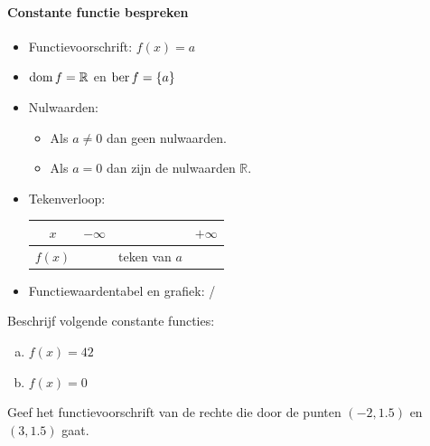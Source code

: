 \documentclass[12pt]{article}
\begin{document}
\paragraph*{Constante functie bespreken}
\begin{mdframed}
  \begin{itemize}
  \item Functievoorschrift: $f(x)=a$
  \item $\dom f = \mathbb{R}$ en $\ber f = \{a\}$
  \item Nulwaarden:
    \begin{itemize}
    \item Als $a\neq 0$ dan geen nulwaarden.
    \item Als $a=0$ dan zijn de nulwaarden $\mathbb{R}$.
    \end{itemize}
  \item Tekenverloop:
    \begin{center}
      \begin{tabular}{c|lcr}
        $x$ & $-\infty$ & & $+\infty$\\
        \hline
        $f(x)$ & & teken van $a$ &
      \end{tabular}
    \end{center}
  \item Functiewaardentabel en grafiek: /
  \end{itemize}
\end{mdframed}

\begin{oefening}
  Beschrijf volgende constante functies:
  \begin{enumerate}[(a)]
  \item $f(x)=42$
  \item $f(x)=0$
  \end{enumerate}
\end{oefening}

\begin{oefening}
  Geef het functievoorschrift van de rechte die door de punten $(-2,1.5)$ en $(3,1.5)$ gaat.
\end{oefening}
\end{document}
